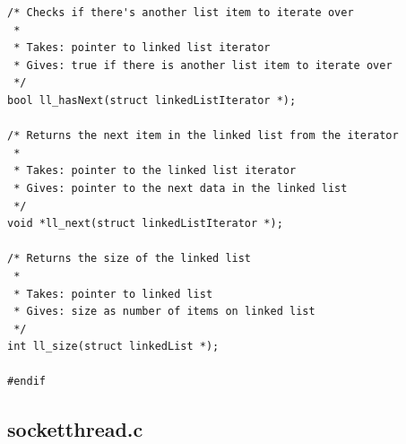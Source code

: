 \documentclass{article}
\begin{document}
\begin{verbatim}
/* Checks if there's another list item to iterate over
 *
 * Takes: pointer to linked list iterator
 * Gives: true if there is another list item to iterate over
 */
bool ll_hasNext(struct linkedListIterator *);

/* Returns the next item in the linked list from the iterator
 *
 * Takes: pointer to the linked list iterator
 * Gives: pointer to the next data in the linked list
 */
void *ll_next(struct linkedListIterator *);

/* Returns the size of the linked list
 *
 * Takes: pointer to linked list
 * Gives: size as number of items on linked list
 */
int ll_size(struct linkedList *);

#endif

\end{verbatim}

\subsection*{socketthread.c}
\end{document}

